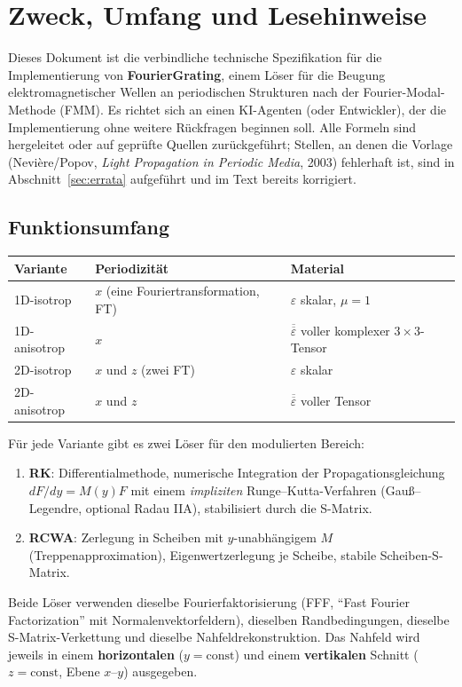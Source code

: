 \section{Zweck, Umfang und Lesehinweise}\label{sec:scope}

Dieses Dokument ist die verbindliche technische Spezifikation für die Implementierung von
\textbf{FourierGrating}, einem Löser für die Beugung elektromagnetischer Wellen an periodischen
Strukturen nach der Fourier-Modal-Methode (FMM). Es richtet sich an einen KI-Agenten (oder
Entwickler), der die Implementierung ohne weitere Rückfragen beginnen soll. Alle Formeln sind
hergeleitet oder auf geprüfte Quellen zurückgeführt; Stellen, an denen die Vorlage
(Nevière/Popov, \emph{Light Propagation in Periodic Media}, 2003) fehlerhaft ist, sind in
Abschnitt~\ref{sec:errata} aufgeführt und im Text bereits korrigiert.

\subsection{Funktionsumfang}
\begin{center}
\begin{tabular}{lll}
\toprule
Variante & Periodizität & Material \\
\midrule
1D-isotrop    & $x$ (eine Fouriertransformation, FT) & $\varepsilon$ skalar, $\mu=1$ \\
1D-anisotrop  & $x$                                  & $\overline{\overline\varepsilon}$ voller komplexer $3\times3$-Tensor \\
2D-isotrop    & $x$ und $z$ (zwei FT)               & $\varepsilon$ skalar \\
2D-anisotrop  & $x$ und $z$                          & $\overline{\overline\varepsilon}$ voller Tensor \\
\bottomrule
\end{tabular}
\end{center}
Für jede Variante gibt es zwei Löser für den modulierten Bereich:
\begin{enumerate}[nosep]
  \item \textbf{RK}: Differentialmethode, numerische Integration der Propagationsgleichung
        $dF/dy=M(y)F$ mit einem \emph{impliziten} Runge--Kutta-Verfahren (Gauß--Legendre, optional
        Radau IIA), stabilisiert durch die S-Matrix.
  \item \textbf{RCWA}: Zerlegung in Scheiben mit $y$-unabhängigem $M$ (Treppenapproximation),
        Eigenwertzerlegung je Scheibe, stabile Scheiben-S-Matrix.
\end{enumerate}
Beide Löser verwenden dieselbe Fourierfaktorisierung (FFF, \enquote{Fast Fourier Factorization}
mit Normalenvektorfeldern), dieselben Randbedingungen, dieselbe S-Matrix-Verkettung und dieselbe
Nahfeldrekonstruktion. Das Nahfeld wird jeweils in einem \textbf{horizontalen} ($y=\text{const}$)
und einem \textbf{vertikalen} Schnitt ($z=\text{const}$, Ebene $x$--$y$) ausgegeben.

